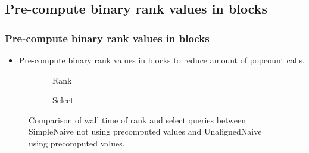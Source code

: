 \documentclass{beamer}
\begin{document}
\subsection{Pre-compute binary rank values in blocks}
\begin{frame}
\frametitle{Pre-compute binary rank values in blocks}
\begin{itemize}
\item Pre-compute binary rank values in blocks to reduce amount of popcount calls.
\end{itemize}
\begin{figure}
	\begin{subfigure}{0.48\textwidth}
		\begin{tiny}
		\scalebox{.7}{}
		\end{tiny}
		\caption{Rank}
	\end{subfigure}
	\hfill
	\begin{subfigure}{0.48\textwidth}
		\begin{tiny}
		\scalebox{.7}{}
		\end{tiny}
		\caption{Select}
	\end{subfigure}
	\caption{Comparison of wall time of rank and select queries between SimpleNaive not using precomputed values and UnalignedNaive using precomputed values.}
\end{figure}
\end{frame}
\end{document}
